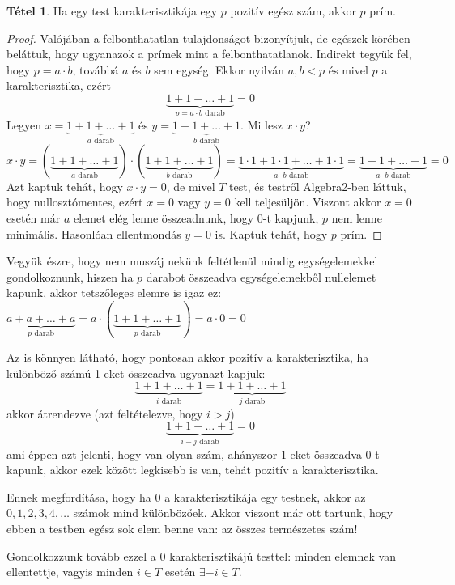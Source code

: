 \documentclass[12pt]{book}
\theoremstyle{plain} %
\theoremstyle{definition} %
\newtheorem{theo/}{Tétel}[section]
\newenvironment{theo}
  {\renewcommand{\qedsymbol}{$\clubsuit$}%
   \pushQED{\qed}\begin{theo/}}
  {\popQED\end{theo/}}
\theoremstyle{remark}
\renewcommand\qedsymbol{$\blacksquare$}
\numberwithin{equation}{section}  %
\begin{document}
	\begin{theo}
		Ha egy test karakterisztikája egy $p$ pozitív egész szám, akkor $p$ prím.
	\end{theo}
	\begin{proof}
		Valójában a felbonthatatlan tulajdonságot bizonyítjuk, de egészek körében beláttuk, hogy ugyanazok a prímek mint a felbonthatatlanok.
		Indirekt tegyük fel, hogy $p=a\cdot b$, továbbá $a$ és $b$ sem egység. Ekkor nyilván $a,b<p$ és mivel $p$ a karakterisztika, ezért
		\[ \underbrace{1+1+\ldots+1}_{p=a\cdot b\text{ darab}} = 0 \]
		Legyen $x=\underbrace{1+1+\ldots+1}_{a \text{ darab}}$ és $y=\underbrace{1+1+\ldots+1}_{b \text{ darab}}$. Mi lesz $x\cdot y$?
		\[ x\cdot y = (\underbrace{1+1+\ldots+1}_{a \text{ darab}}) \cdot (\underbrace{1+1+\ldots+1}_{b \text{ darab}}) = \underbrace{1\cdot 1+1\cdot 1 +\ldots+1\cdot 1}_{a\cdot b \text{ darab}} = \underbrace{1+1+\ldots+1}_{a\cdot b\text{ darab}} = 0\]
		Azt kaptuk tehát, hogy $x\cdot y = 0$, de mivel $T$ test, és testről Algebra2-ben láttuk, hogy nullosztómentes, ezért $x=0$ vagy $y=0$ kell teljesüljön. Viszont akkor $x=0$ esetén már $a$ elemet elég lenne összeadnunk, hogy $0$-t kapjunk, $p$ nem lenne minimális. Hasonlóan ellentmondás $y=0$ is. Kaptuk tehát, hogy $p$ prím.
	\end{proof}
	Vegyük észre, hogy nem muszáj nekünk feltétlenül mindig egységelemekkel gondolkoznunk, hiszen ha $p$ darabot összeadva egységelemekből nullelemet kapunk, akkor tetszőleges elemre is igaz ez: $\underbrace{a+a+\ldots+a}_{p \text{ darab}} = a\cdot (\underbrace{1+1+\ldots+1}_{p \text{ darab}}) = a\cdot 0 = 0$
	
	Az is könnyen látható, hogy pontosan akkor pozitív a karakterisztika, ha különböző számú 1-eket összeadva ugyanazt kapjuk:
	\[ \underbrace{1+1+\ldots+1}_{i \text{ darab}} = \underbrace{1+1+\ldots+1}_{j \text{ darab}} \]
	akkor átrendezve (azt feltételezve, hogy $i>j$)
	\[ \underbrace{1+1+\ldots+1}_{i-j \text{ darab}} = 0 \]
	ami éppen azt jelenti, hogy van olyan szám, ahányszor 1-eket összeadva 0-t kapunk, akkor ezek között legkisebb is van, tehát pozitív a karakterisztika.
	
	Ennek megfordítása, hogy ha 0 a karakterisztikája egy testnek, akkor az $0,1,2,3,4,\ldots$ számok mind különbözőek. Akkor viszont már ott tartunk, hogy ebben a testben egész sok elem benne van: az összes természetes szám!
	
	Gondolkozzunk tovább ezzel a 0 karakterisztikájú testtel: minden elemnek van ellentettje, vagyis minden $i\in T$ esetén $\exists -i\in T$.
	
\end{document}
